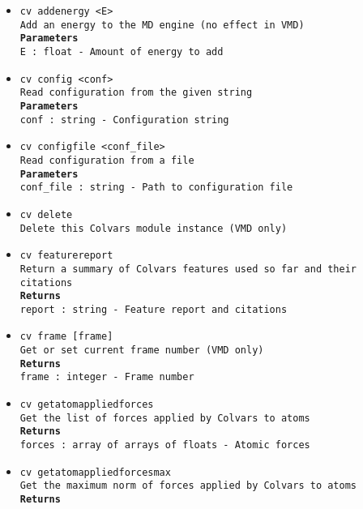 \begin{itemize}
\item \texttt{cv addenergy <E>}
\\
\texttt{Add an energy to the MD engine (no effect in VMD)}
\\
\texttt{\textbf{Parameters}}
\\
\texttt{E : float - Amount of energy to add}
\item \texttt{cv config <conf>}
\\
\texttt{Read configuration from the given string}
\\
\texttt{\textbf{Parameters}}
\\
\texttt{conf : string - Configuration string}
\item \texttt{cv configfile <conf\_file>}
\\
\texttt{Read configuration from a file}
\\
\texttt{\textbf{Parameters}}
\\
\texttt{conf\_file : string - Path to configuration file}
\item \texttt{cv delete}
\\
\texttt{Delete this Colvars module instance (VMD only)}
\item \texttt{cv featurereport}
\\
\texttt{Return a summary of Colvars features used so far and their citations}
\\
\texttt{\textbf{Returns}}
\\
\texttt{report : string - Feature report and citations}
\item \texttt{cv frame [frame]}
\\
\texttt{Get or set current frame number (VMD only)}
\\
\texttt{\textbf{Returns}}
\\
\texttt{frame : integer - Frame number}
\item \texttt{cv getatomappliedforces}
\\
\texttt{Get the list of forces applied by Colvars to atoms}
\\
\texttt{\textbf{Returns}}
\\
\texttt{forces : array of arrays of floats - Atomic forces}
\item \texttt{cv getatomappliedforcesmax}
\\
\texttt{Get the maximum norm of forces applied by Colvars to atoms}
\\
\texttt{\textbf{Returns}}
\\

\end{itemize}
